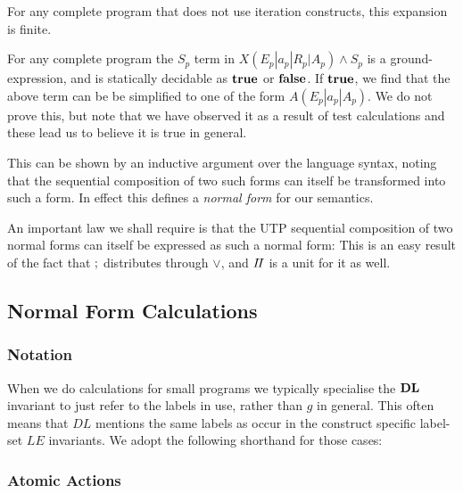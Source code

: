     For any complete program that does not use iteration constructs,
    this expansion is finite.

    For any complete program the $S_p$
    term in $X(E_p|a_p|R_p|A_p) \land S_p$
    is a ground-expression, and is statically decidable as $\mathbf{true}$ or $\mathbf{false}$.
    If $\mathbf{true}$, we find that the above term
    can be be simplified to one of the form $A(E_p|a_p|A_p)$.
    We do not prove this, but note that we have observed it as a result
    of test calculations and these lead us to believe it is true in general.

This can be shown by an inductive argument over the language syntax,
noting that the sequential composition of two such forms
can itself be transformed into such a form.
In effect this defines a \emph{normal form} for our semantics.


An important law we shall require is that the UTP sequential
composition of two normal forms can itself be expressed
as such a normal form:
This is an easy result of the fact that $\mathrel{;}$ distributes through $\lor$,
and $I\!I$ is a unit for it as well.

\subsection{Normal Form Calculations}\label{ssec:nf-calc}

\subsubsection{Notation}

When we do calculations for small programs
we typically specialise the $\mathbf{DL}$ invariant to just refer
to the labels in use, rather than $g$ in general.
This often means that $DL$ mentions the same labels as occur
in the construct specific label-set $LE$ invariants.
We adopt the following shorthand for those cases:

\subsubsection{Atomic Actions}


